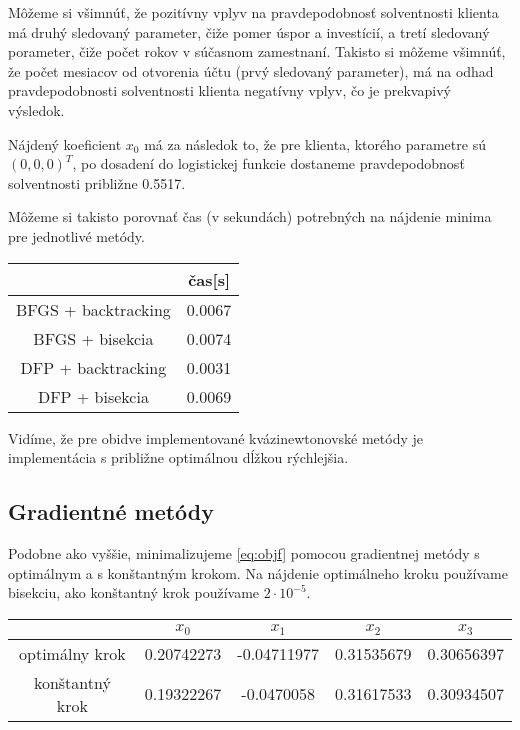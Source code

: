 \documentclass[report.tex]{subfiles}
\begin{document}
Môžeme si všimnúť, že pozitívny vplyv na pravdepodobnosť solventnosti klienta má druhý sledovaný parameter, čiže pomer úspor a investícií, a tretí sledovaný porameter, čiže počet rokov v súčasnom zamestnaní. Takisto si môžeme všimnúť, že počet mesiacov od otvorenia účtu (prvý sledovaný parameter), má na odhad pravdepodobnosti solventnosti klienta negatívny vplyv, čo je prekvapivý výsledok. 

Nájdený koeficient $x_0$ má za následok to, že pre klienta, ktorého parametre sú $(0,0,0)^T$, po dosadení do logistickej funkcie dostaneme pravdepodobnosť solventnosti približne 0.5517.

Môžeme si takisto porovnať čas (v sekundách) potrebných na nájdenie minima pre jednotlivé metódy.

\begin{center}
	\small
	\begin{tabular}{| c | c |}
		\hline
		& čas[s]  \\
		\hline
		BFGS + backtracking & 0.0067  \\
		BFGS + bisekcia & 0.0074  \\
		DFP + backtracking & 0.0031  \\
		DFP + bisekcia & 0.0069  \\
		\hline
	\end{tabular}
\end{center}

Vidíme, že pre obidve implementované kvázinewtonovské metódy je implementácia s približne optimálnou dĺžkou rýchlejšia.

\subsection{Gradientné metódy}

Podobne ako vyššie, minimalizujeme \ref{eq:objf} pomocou gradientnej metódy s optimálnym a s konštantným krokom. Na nájdenie optimálneho kroku používame bisekciu, ako konštantný krok používame $2\cdot 10^{-5}$.

\begin{center}
	\small
	\begin{tabular}{| c | c  c  c  c |}
		\hline
		& $x_0$ & $x_1$ & $x_2$ & $x_3$ \\
		\hline
		optimálny krok & 0.20742273 & -0.04711977 & 0.31535679 & 0.30656397 \\
		konštantný krok & 0.19322267 & -0.0470058 &  0.31617533 & 0.30934507 \\
		\hline
	\end{tabular}
\end{center}
\end{document}
